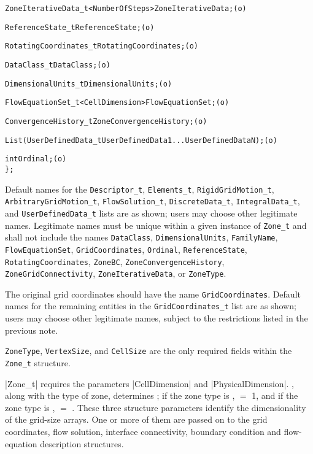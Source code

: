 \begin{alltt}
    ZoneIterativeData_t<NumberOfSteps> ZoneIterativeData ;                  (o)

    ReferenceState_t ReferenceState ;                                       (o)

    RotatingCoordinates\_t RotatingCoordinates ;                             (o)

    DataClass_t DataClass ;                                                 (o)

    DimensionalUnits_t DimensionalUnits ;                                   (o)

    FlowEquationSet_t<CellDimension> FlowEquationSet ;                      (o)

    ConvergenceHistory_t ZoneConvergenceHistory ;                           (o)

    List( UserDefinedData\_t UserDefinedData1 ... UserDefinedDataN ) ;       (o)

    int Ordinal ;                                                           (o)
    \} ;
\end{alltt}

\begin{notes}
\item
 Default names for the \texttt{Descriptor\_t},
 \texttt{Elements\_t}, \texttt{RigidGridMotion\_t}, \texttt{ArbitraryGridMotion\_t},
 \texttt{FlowSolution\_t}, \texttt{DiscreteData\_t}, \texttt{IntegralData\_t}, and
 \texttt{UserDefinedData\_t}
 lists are as shown; users may choose other legitimate names.
 Legitimate names must be unique within a given instance of \texttt{Zone\_t}
 and shall not include the names
 \texttt{DataClass}, \texttt{DimensionalUnits}, \texttt{FamilyName},
 \texttt{FlowEquationSet}, \texttt{GridCoordinates}, \texttt{Ordinal},
 \texttt{Reference\-State}, \texttt{RotatingCoordinates}, \texttt{ZoneBC},
 \texttt{ZoneConvergenceHistory}, \texttt{ZoneGridConnectivity},
 \texttt{ZoneIterativeData}, or \texttt{ZoneType}.
\item
 The original grid coordinates should have the name \texttt{GridCoordinates}.
 Default names for the remaining entities in the \texttt{GridCoordinates\_t}
 list are as shown; users may choose other legitimate names, subject to
 the restrictions listed in the previous note.
\item
 \texttt{ZoneType}, \texttt{VertexSize}, and \texttt{CellSize}
 are the only required fields within the \texttt{Zone\_t} structure.
\end{notes}

|Zone_t| requires the parameters |CellDimension| and
|PhysicalDimension|.
, along with the type of zone, determines
; if the zone type is ,
 $=$ 1, and if the zone type is , 
 $=$ .
These three structure parameters identify the dimensionality of the
grid-size arrays.
One or more of them are passed on to the grid coordinates, flow
solution, interface connectivity, boundary condition and flow-equation
description structures.

